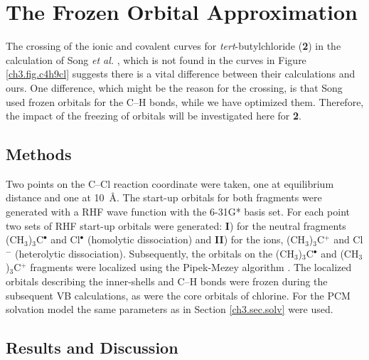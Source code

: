 \section{The Frozen Orbital Approximation}

The crossing of the ionic and covalent curves for \textit{tert}-butylchloride (\textbf{2}) in the calculation of Song \textit{et al.} \cite{song}, which is not found in the curves in Figure \ref{ch3.fig.c4h9cl} suggests there is a vital difference between their calculations and ours. One difference, which might be the reason for the crossing, is that Song used frozen orbitals for the C--H bonds, while we have optimized them. Therefore, the impact of the freezing of orbitals will be investigated here for \textbf{2}.

\subsection{Methods}

Two points on the C--Cl reaction coordinate were taken, one at equilibrium distance and one at \mbox{10 \AA}. The start-up orbitals for both fragments were generated with a RHF wave function with the 6-31G* basis set. For each point two sets of RHF start-up orbitals were generated: \textbf{I}) for the neutral fragments (CH$_3$)$_3$C$^\bullet$ and Cl$^\bullet$ (homolytic dissociation) and \textbf{II}) for the ions, (CH$_3$)$_3$C$^{+}$ and Cl$^{-}$ (heterolytic dissociation). Subsequently, the orbitals on the (CH$_3$)$_3$C$^\bullet$ and (CH$_3$)$_3$C$^{+}$ fragments were localized using the Pipek-Mezey algorithm \cite{pipek}. The localized orbitals describing the inner-shells and C--H bonds were frozen during the subsequent VB calculations, as were the core orbitals of chlorine.  For the PCM solvation model the same parameters as in Section \ref{ch3.sec.solv} were used.

\subsection{\label{ch3.sec.res.freez}Results and Discussion}

